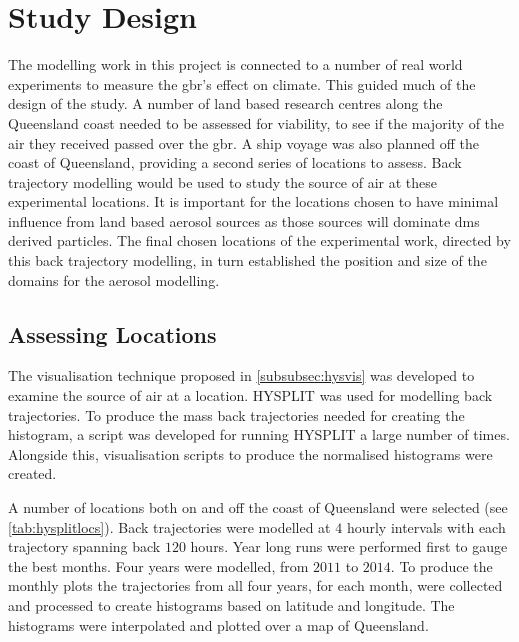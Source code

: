 \section{Study Design}
\label{sec:std}


The modelling work in this project is connected to a number of real world experiments to measure the \gls{gbr}'s effect on climate. This guided much of the design of the study. A number of land based research centres along the Queensland coast needed to be assessed for viability, to see if the majority of the air they received passed over the \gls{gbr}. A ship voyage was also planned off the coast of Queensland, providing a second series of locations to assess. Back trajectory modelling would be used to study the source of air at these experimental locations. It is important for the locations chosen to have minimal influence from land based aerosol sources as those sources will dominate \gls{dms} derived particles. The final chosen locations of the experimental work, directed by this back trajectory modelling, in turn established the position and size of the domains for the aerosol modelling.
 
\subsection{Assessing Locations}
\label{subsec:hyex}

The visualisation technique proposed in \cref{subsubsec:hysvis} was developed to examine the source of air at a location. HYSPLIT was used for modelling back trajectories. To produce the mass back trajectories needed for creating the histogram, a script was developed for running HYSPLIT a large number of times. Alongside this, visualisation scripts to produce the normalised histograms were created. 

A number of locations both on and off the coast of Queensland were selected (see \cref{tab:hysplitlocs}). Back trajectories were modelled at $4$ hourly intervals with each trajectory spanning back $120$ hours. Year long runs were performed first to gauge the best months. Four years were modelled, from $2011$ to $2014$. To produce the monthly plots the trajectories from all four years, for each month, were collected and processed to create histograms based on latitude and longitude. The histograms were interpolated and plotted over a map of Queensland.

